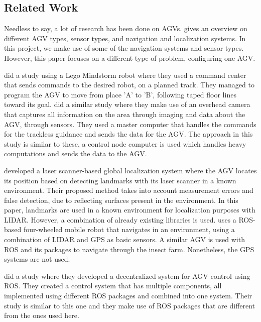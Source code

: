 \subsection{Related Work}
Needless to say, a lot of research has been done on AGVs. \cite{Lynch} gives an overview on different AGV types, sensor types, and navigation and localization systems. In this project, we make use of some of the navigation systems and sensor types. However, this paper focuses on a different type of problem, configuring one AGV.

\cite{kostov2015} did a study using a Lego Mindstorm robot where they used a command center that sends commands to the desired robot, on a planned track. They managed to program the AGV to move from place  'A' to 'B', following taped floor lines toward its goal. \cite{zheng2022} did a similar study where they make use of an overhead camera that captures all information on the area through imaging and data about the AGV, through sensors. They used a master computer that handles the commands for the trackless guidance and sends the data for the AGV. The  approach in this study is similar to these, a control node computer is used which handles heavy computations and sends the data to the AGV.

\cite{ronzini2011} developed a laser scanner-based global localization system where the AGV locates its position based on detecting landmarks with its laser scanner in a known environment. Their proposed method takes into account measurement errors and false detection, due to reflecting surfaces present in the environment. In this paper, landmarks are used in a known environment for localization purposes with LIDAR. However, a combination of already existing libraries is used. \cite{CHIKURTEV2021} uses a ROS-based four-wheeled mobile robot that navigates in an environment, using a combination of LIDAR and GPS as basic sensors. A similar AGV  is used with ROS and its packages to navigate through the insect farm. Nonetheless, the GPS systems are not used.

\cite{walenta2017} did a study where they developed a decentralized system for AGV control using ROS. They created a control system that has multiple components, all implemented using different ROS packages and combined into one system. Their study is similar to this one and they make use of ROS packages that are different from the ones used here.

